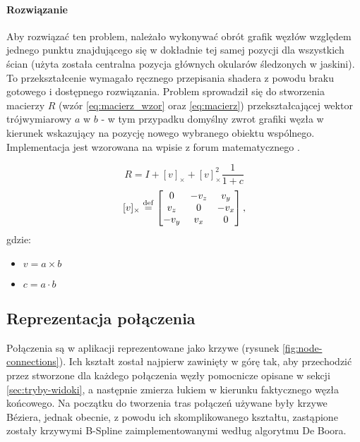 
\paragraph{Rozwiązanie} Aby rozwiązać ten problem, należało wykonywać obrót grafik węzłów względem jednego punktu znajdującego się w dokładnie tej samej pozycji dla wszystkich ścian (użyta została centralna pozycja głównych okularów śledzonych w jaskini). To przekształcenie wymagało ręcznego przepisania shadera z powodu braku gotowego i dostępnego rozwiązania. Problem sprowadził się do stworzenia macierzy \(R\) (wzór \ref{eq:macierz_wzor} oraz \ref{eq:macierz}) przekształcającej wektor trójwymiarowy \(a\) w \(b\) - w tym przypadku domyślny zwrot grafiki węzła w kierunek wskazujący na pozycję nowego wybranego obiektu wspólnego. Implementacja jest wzorowana na wpisie z forum matematycznego \cite{BillboardShaderFormula}.

\newcommand\dotProd{a \cdot b}
\newcommand\crossProd[1]{(\overrightarrow{a \times b})_#1}
\begin{equation}
	\label{eq:macierz_wzor}
	R = I + [v]_{\times} + [v]_{\times}^2\frac{1}{1 + c}
\end{equation}
\begin{equation}
	\label{eq:macierz}
	[v]_{\times} \stackrel{\rm def}{=} 
	\begin{bmatrix}
		0 & -v_z & v_y\\
		v_z & 0 & -v_x\\
		-v_y & v_x & 0
	\end{bmatrix},
\end{equation}
gdzie:
\begin{itemize}
	\item \(v = a \times b\)
	\item \(c = a \cdot b\)
\end{itemize}

\subsection{Reprezentacja połączenia}
Połączenia są w aplikacji reprezentowane jako krzywe (rysunek \ref{fig:node-connections}). Ich kształt został najpierw zawinięty w górę tak, aby przechodzić przez stworzone dla każdego połączenia węzły pomocnicze opisane w sekcji \ref{sec:tryby-widoki}, a następnie zmierza łukiem w kierunku faktycznego węzła końcowego. Na początku do tworzenia tras połączeń używane były krzywe Béziera, jednak obecnie, z powodu ich skomplikowanego kształtu, zastąpione zostały krzywymi B-Spline zaimplementowanymi według algorytmu De Boora.

